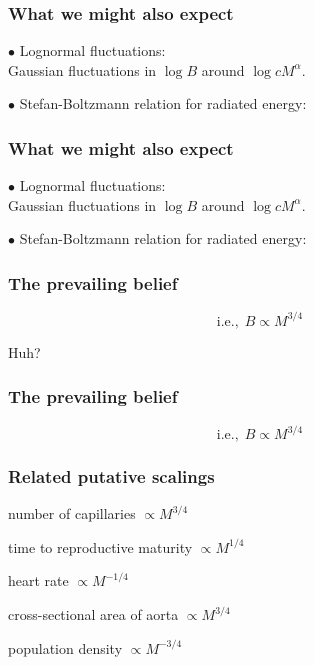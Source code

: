 \begin{frame}
  \frametitle{What we might also expect} 

$\bullet$  Lognormal fluctuations:\\
\quad Gaussian fluctuations in $\log{B}$ around $\log{cM^\alpha}$.

\invisible

$\bullet$  Stefan-Boltzmann relation for radiated energy:\\

\visible

\end{frame}

\begin{frame}
  \frametitle{What we might also expect} 

$\bullet$  Lognormal fluctuations:\\
\quad Gaussian fluctuations in $\log{B}$ around $\log{cM^\alpha}$.

$\bullet$  Stefan-Boltzmann relation for radiated energy:\\

\end{frame}

\begin{frame}
  \frametitle{The prevailing belief}

\vspace{2mm}


$$ \mbox{i.e.,} \ \ B \propto M^{3/4}$$

\invisible 

Huh?

\visible

\end{frame}

\begin{frame}
  \frametitle{The prevailing belief}

\vspace{2mm}

$$ \mbox{i.e.,} \ \ B \propto M^{3/4}$$


\end{frame}

\begin{frame}
  \frametitle{Related putative scalings}

number of capillaries $\propto M^{3/4}$

time to reproductive maturity $\propto M^{1/4}$

heart rate $\propto M^{-1/4}$

cross-sectional area of aorta $\propto M^{3/4}$

population density $\propto M^{-3/4}$

\end{frame}

